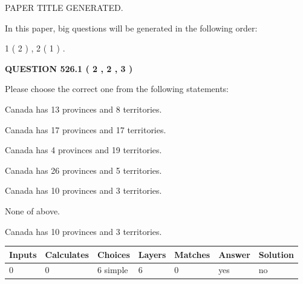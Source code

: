 \documentclass[12pt]{article}
\begin{document}
   
\vspace{0.2in}
   
   
   
   
   
   
   
   
 \vspace{0.2in}
 
 
 
 
   
   
 PAPER TITLE GENERATED.
   
   
   
\vspace{0.2in}
   
In this paper, big questions will be generated in the following order: 
   
   
   1 ( 2 )
 ,
   2 ( 1 )
 .
  
\vspace{0.2in}
  
{\textbf{\Large{QUESTION
526.1 
 ( 2 , 2 , 3 )
}}}
  
  
Please choose the correct one from the following statements:
 
 
Canada has  13 provinces and  8 territories.
 
 
Canada has  17 provinces and  17 territories.
 
 
Canada has   4 provinces and  19 territories.
 
 
Canada has  26 provinces and  5 territories.
 
 
Canada has 10  provinces and 3 territories.
 
 
 None of above.
 
 
\noindent{}
 
 
Canada has 10  provinces and 3 territories.
 
 
\noindent{}
 
 
   
   
   
   
\noindent\begin{tabular}{|l|l|l|l|l|l|l|}
 \hline
Inputs & Calculates & Choices & Layers & Matches & Answer & Solution \\ \hline
 0  & 
 0  & 
 6
  simple  
  & 
 6  & 
 0  & 
  yes & 
  no 
  \\ \hline
 \end{tabular}
   
\end{document}
